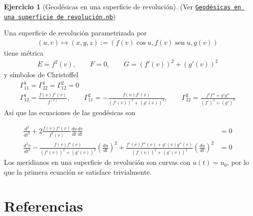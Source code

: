 \documentclass[spanish]{book}
\theoremstyle{definition}
\newtheorem*{ejer*}{Ejercicio}
\DeclareMathOperator{\sen}{sen}
\begin{document}
	\begin{ejer*}[Geodésicas en una superficie de revolución] (Ver \href{https://github.com/dan-gc/geo-riem/blob/main/Geodésicas%20en%20una%20superficie%20de%20revolución.nb}{\texttt{Geodésicas en una superficie de revolución.nb}})
		
		Una superficie de revolución parametrizada por
		\begin{align*}
			(u,v)\mapsto(x,y,z):=(f(v)\cos u,f(v)\sen u,g(v))
		\end{align*}
		tiene métrica
		\begin{align*}
			E=f^2(v),\qquad F=0,\qquad G=(f'(v))^2+(g'(v))^2
		\end{align*}
		y símbolos de Christoffel
		\begin{gather*}
			\Gamma^1_{11}=\Gamma^1_{22}=\Gamma^2_{12}=0\\
			\Gamma^1_{12}=\frac{f(v)f'(v)}{f^(v)},\qquad \Gamma^2_{11}=-\frac{f(v)f'(v)}{(f'(v))^2+(g'(v))^2},\qquad \Gamma^2_{22}=\frac{f'f''+g'g''}{(f')^2+(g')^2} 
		\end{gather*}
		Así que las ecuaciones de las geodésicas son
		
		\begin{align*}
			\frac{d^2}{dt^2}+2\frac{f(v)f'(v)}{f^2(v)}\frac{du}{dt}\frac{dv}{dt}&=0\\
			\frac{d^2v}{dt^2}-\frac{f(v)f'(v)}{(f'(v))^2+(g'(v))^2}\left(\frac{du}{dt}\right)^2+\frac{f'(v)f''(v)+g'(v)g''(v)}{(f'(v))^2+(g'(v))^2}\left(\frac{du}{dt}\right)^2&=0
		\end{align*}
		Los meridianos en una superficie de revolución son curvas con $u(t)=u_0$, por lo que la primera ecuación se satisface trivialmente. 
	\end{ejer*}	
	\chapter{Referencias}
	\printbibliography[heading=none]
	
\end{document}
